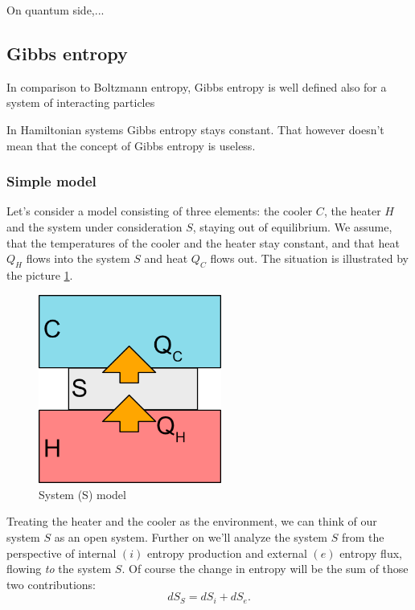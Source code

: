 \documentclass[a4paper,12pt,nofootinbib]{article}
\begin{document}
On quantum side,... 
\subsection{Gibbs entropy}

In comparison to Boltzmann entropy, Gibbs entropy is well defined also for a system of interacting particles



In Hamiltonian systems Gibbs entropy stays constant.
That however doesn't mean that the concept of Gibbs entropy 
is useless.


\subsubsection{Simple model}
Let's consider a model consisting of three elements: the cooler $C$, the heater $H$ and the system under consideration $S$, staying out of equilibrium.
We assume, that the temperatures of the cooler and the heater stay constant, and that heat $Q_H$ flows into the system $S$ and heat $Q_C$ flows out. The situation is illustrated by the picture \ref{Fig2}.
\begin{figure}[ht!]
\centering \includegraphics[width=6cm]{system} \caption{System (S) model}
\label{Fig2} 
\end{figure}

Treating the heater and the cooler as the environment, we can think of our system $S$ as an open system.
Further on we'll analyze the system $S$ from the perspective of internal $(i)$ entropy production
and external $(e)$ entropy flux, flowing \emph{to} the system $S$. 
Of course the change in entropy will be the sum of those two contributions:
\begin{equation}
dS_S=dS_i+dS_e.
\label{entrosum}
\end{equation}
\end{document}
